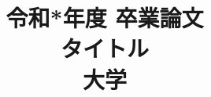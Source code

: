 \title{
  \LARGE 令和*年度 卒業論文 \\
  \vspace{3em}
  \Huge タイトル \\
  \vspace{1em}
  \huge *大学 \\
  \vspace{0.5em}
}
\maketitle

